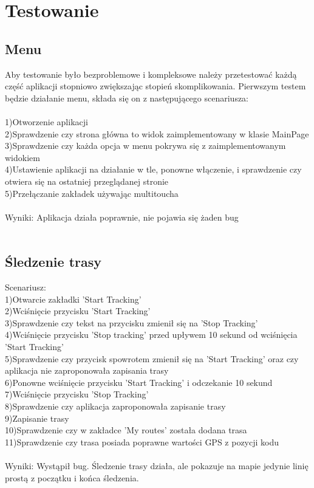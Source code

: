 	\newpage
\section{Testowanie}	%
\subsection{Menu} %
Aby testowanie było bezproblemowe i kompleksowe należy przetestować każdą część aplikacji stopniowo zwiększając stopień skomplikowania. Pierwszym testem będzie działanie menu, składa się on z następującego scenariusza:\\\\
1)Otworzenie aplikacji\\
2)Sprawdzenie czy strona główna to widok zaimplementowany w klasie MainPage\\
3)Sprawdzenie czy każda opcja w menu pokrywa się z zaimplementowanym widokiem\\
4)Ustawienie aplikacji na działanie w tle, ponowne włączenie, i sprawdzenie czy otwiera się na ostatniej przeglądanej stronie\\
5)Przełączanie zakładek używając multitoucha\\\\
Wyniki: Aplikacja działa poprawnie, nie pojawia się żaden bug\\\\
\newpage
\subsection{Śledzenie trasy} %
Scenariusz:\\
1)Otwarcie zakładki 'Start Tracking'\\
2)Wciśnięcie przycisku 'Start Tracking'\\
3)Sprawdzenie czy tekst na przycisku zmienił się na 'Stop Tracking'\\
4)Wciśnięcie przycisku 'Stop tracking' przed upływem 10 sekund od wciśnięcia 'Start Tracking'\\
5)Sprawdzenie czy przycisk spowrotem zmienił się na 'Start Tracking' oraz czy aplikacja nie zaproponowała zapisania trasy\\
6)Ponowne wciśnięcie przycisku 'Start Tracking' i odczekanie 10 sekund\\
7)Wciśnięcie przycisku 'Stop Tracking'\\
8)Sprawdzenie czy aplikacja zaproponowała zapisanie trasy\\
9)Zapisanie trasy\\
10)Sprawdzenie czy w zakładce 'My routes' została dodana trasa\\
11)Sprawdzenie czy trasa posiada poprawne wartości GPS z pozycji kodu\\\\
Wyniki: Wystąpił bug. Śledzenie trasy działa, ale pokazuje na mapie jedynie linię prostą z początku i końca śledzenia.\\\\
\newpage
